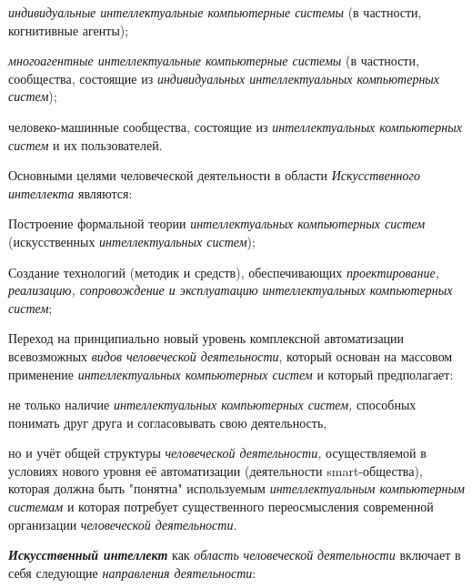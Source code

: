 \begin{textitemize}
	\item
	\textit{индивидуальные интеллектуальные компьютерные системы} (в частности, когнитивные агенты);
	\item
	\textit{многоагентные интеллектуальные компьютерные системы} (в частности, сообщества, состоящие из \textit{индивидуальных интеллектуальных компьютерных систем});
	\item
	человеко-машинные сообщества, состоящие из \textit{интеллектуальных компьютерных систем} и их пользователей.
\end{textitemize}

Основными целями человеческой деятельности в области \textit{Искусственного интеллекта} являются:

\begin{textitemize}
	\item
	Построение формальной теории \textit{интеллектуальных компьютерных систем} (искусственных \textit{интеллектуальных систем});
	\item
	Создание технологий (методик и средств), обеспечивающих \textit{проектирование, реализацию, сопровождение и эксплуатацию интеллектуальных компьютерных систем};
	\item
	Переход на принципиально новый уровень комплексной автоматизации всевозможных \textit{видов человеческой деятельности}, который основан на массовом применение \textit{интеллектуальных компьютерных систем} и который предполагает:
	\begin{textitemize}
		\item
		не только наличие \textit{интеллектуальных компьютерных систем,} способных понимать друг друга и согласовывать свою деятельность,
		\item
		но и учёт общей структуры \textit{человеческой деятельности,} осуществляемой в условиях нового уровня её автоматизации (деятельности smart-общества), которая должна быть "понятна" используемым \textit{интеллектуальным компьютерным системам} и которая потребует существенного переосмысления современной организации \textit{человеческой деятельности}.
	\end{textitemize}
\end{textitemize}

\textbf{\textit{Искусственный интеллект}} как \textit{область} \textit{человеческой} \textit{деятельности} включает в себя следующие \textit{направления деятельности}:

